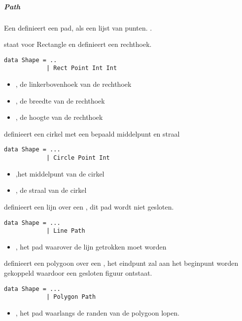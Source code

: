 \subparagraph{Path}
Een  definieert een pad, als een lijst van punten. .

 staat voor Rectangle en definieert een rechthoek. 
\begin{lstlisting}
data Shape = ..
			| Rect Point Int Int
\end{lstlisting}
\begin{itemize}
	\item {}, de linkerbovenhoek van de rechthoek
	\item {}, de breedte van de rechthoek
	\item {}, de hoogte van de rechthoek
\end{itemize}

 definieert een cirkel met een bepaald middelpunt en straal
\begin{lstlisting}
data Shape = ...
			| Circle Point Int
\end{lstlisting}
\begin{itemize}
	\item {},het middelpunt van de cirkel
	\item {}, de straal van de cirkel
\end{itemize}

 definieert een lijn over een , dit pad wordt niet gesloten.
\begin{lstlisting}
data Shape = ...
			| Line Path
\end{lstlisting}
\begin{itemize}
	\item {}, het pad waarover de lijn getrokken moet worden
\end{itemize}		

 definieert een polygoon over een , het eindpunt zal aan het beginpunt worden gekoppeld waardoor een gesloten figuur ontstaat.
\begin{lstlisting}
data Shape = ...
			| Polygon Path
\end{lstlisting}
\begin{itemize}
	\item {}, het pad waarlangs de randen van de polygoon lopen.
\end{itemize}

